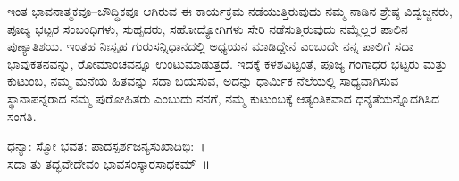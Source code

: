 {ಇಂತ ಭಾವನಾತ್ಮಕವೂ–ಬೌದ್ಧಿಕವೂ ಆಗಿರುವ ಈ ಕಾರ್ಯಕ್ರಮ ನಡೆಯುತ್ತಿರುವುದು ನಮ್ಮ ನಾಡಿನ ಶ್ರೇಷ್ಠ ವಿದ್ವಜ್ಜನರು, ಪೂಜ್ಯ ಭಟ್ಟರ ಸಂಬಂಧಿಗಳು, ಸುಹೃದರು, ಸಹೋದ್ಯೋಗಿಗಳು ಸೇರಿ ನಡೆಸುತ್ತಿರುವುದು ನಮ್ಮೆಲ್ಲರ ಪಾಲಿನ ಪುಣ್ಯಾತಿಶಯ. ಇಂತಹ ನಿಃಸ್ಪೃಹ ಗುರುಸನ್ನಿಧಾನದಲ್ಲಿ ಅಧ್ಯಯನ ಮಾಡಿದ್ದೇನೆ ಎಂಬುದೇ ನನ್ನ ಪಾಲಿಗೆ ಸದಾ ಭಾವುಕತನವನ್ನು, ರೋಮಾಂಚವನ್ನೂ ಉಂಟುಮಾಡುತ್ತದೆ. ಇದಕ್ಕೆ ಕಳಶವಿಟ್ಟಂತೆ, ಪೂಜ್ಯ ಗಂಗಾಧರ ಭಟ್ಟರು ಮತ್ತು ಕುಟುಂಬ, ನಮ್ಮ ಮನೆಯ ಹಿತವನ್ನು ಸದಾ ಬಯಸುವ, ಅದನ್ನು ಧಾರ್ಮಿಕ ನೆಲೆಯಲ್ಲಿ ಸಾಧ್ಯವಾಗಿಸುವ ಸ್ಥಾನಾಪನ್ನರಾದ ನಮ್ಮ ಪುರೋಹಿತರು ಎಂಬುದು ನನಗೆ, ನಮ್ಮ ಕುಟುಂಬಕ್ಕೆ ಆತ್ಯಂತಿಕವಾದ ಧನ್ಯತೆಯನ್ನೊದಗಿಸಿದ ಸಂಗತಿ. 
\begin{center}
ಧನ್ಯಾ: ಸ್ಮೋ ಭವತ: ಪಾದಸ್ಪರ್ಶಜನ್ಯಸುಖಾದಿಭಿ:~।\\
ಸದಾ ತು ತದ್ಭವೇದೇವಂ ಭಾವಸಂಸ್ಕಾರಸಾಧಕಮ್~॥
\end{center}

\articleend	
}

